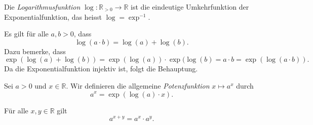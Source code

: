 \documentclass[../main.tex]{subfiles}
\begin{document}
\begin{definition}
  Die \emph{Logarithmusfunktion}
  $\log \colon \mathbb{R}_{>0} \to \mathbb{R}$ ist die
  eindeutige Umkehrfunktion der Exponentialfunktion,
  das heisst $\log = \exp^{-1}$.
\end{definition}

\begin{remark}
Es gilt für alle $a, b > 0$, dass
\[
  \log(a \cdot b) = \log(a) + \log(b).
\]
Dazu bemerke, dass
\[
  \exp(\log(a) + \log(b)) = 
  \exp(\log(a)) \cdot \exp(\log(b) 
  = a \cdot b = \exp(\log(a \cdot b)).
\]
Da die Exponentialfunktion injektiv ist,
folgt die Behauptung.
\end{remark}

\begin{definition}
  Sei $a > 0$ und $x \in \mathbb{R}$. Wir definieren
  die allgemeine \emph{Potenzfunktion}
  $x \mapsto a^x$ durch
  \[
    a^x = \exp(\log(a) \cdot x).
  \]
\end{definition}

\begin{remark}
  Für alle $x, y \in \mathbb{R}$ gilt
  \[
    a^{x+y} = a^{x} \cdot a^{y}.
  \]
\end{remark}
\end{document}
